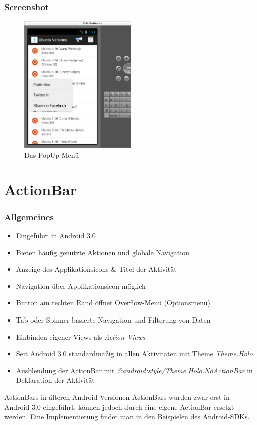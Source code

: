 \begin{frame}
   \frametitle{Screenshot}
   \begin{figure}[h!]
     \centering
     \includegraphics[width=0.5\textwidth]{pictures/ubuntu_popup.ps}
     \caption{
        Das PopUp-Menü
     }
     \label{fig:ubuntu_popup}
   \end{figure}
\end{frame}

\section{ActionBar}
\begin{frame}
   \frametitle{Allgemeines}
   \begin{itemize}
      \item Eingeführt in Android 3.0
      \item Bieten häufig genutzte Aktionen und globale Navigation
      \item Anzeige des Applikationsicons \& Titel der Aktivität
      \item Navigation über Applikationsicon möglich
      \item Button am rechten Rand öffnet Overflow-Menü (Optionsmenü)
      \item Tab oder Spinner basierte Navigation und Filterung von Daten
      \item Einbinden eigener Views als \emph{Action Views}
      \item Seit Android 3.0 standardmäßig in allen Aktivitäten mit Theme \emph{Theme.Holo}
      \item Ausblendung der ActionBar mit \emph{@android:style/Theme.Holo.NoActionBar} 
         in Deklaration der Aktivität
   \end{itemize}

   \begin{alertblock}{ActionBars in älteren Android-Versionen}
      ActionBars wurden zwar erst in Android 3.0 eingeführt, 
      können jedoch durch eine eigene ActionBar ersetzt werden. 
      Eine Implementierung findet man in den Beispielen des Android-SDKs.
   \end{alertblock}
\end{frame}

